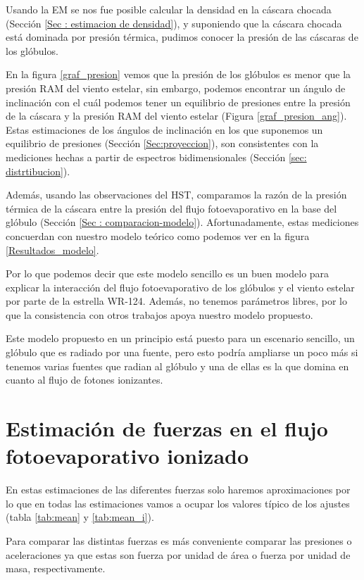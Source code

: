 \documentclass{book}
\begin{document}
Usando la EM se nos fue posible calcular la densidad en la cáscara chocada (Sección \ref{Sec : estimacion de densidad}), y suponiendo que la cáscara chocada está dominada por presión térmica, pudimos conocer la presión de las cáscaras de los glóbulos.

En la figura \ref{graf_presion} vemos que la presión de los glóbulos es menor que la presión RAM del viento estelar, sin embargo, podemos encontrar un ángulo de inclinación con el cuál podemos tener un equilibrio de presiones entre la presión de la cáscara y la presión RAM del viento estelar (Figura \ref{graf_presion_ang}). Estas estimaciones de los ángulos de inclinación en los que suponemos un equilibrio de presiones (Sección \ref{Sec:proyeccion}), son consistentes con la mediciones hechas a partir de espectros bidimensionales (Sección \ref{sec: distrtibucion}).

Además, usando las observaciones del HST, comparamos la razón de la presión térmica de la cáscara entre la presión del flujo fotoevaporativo en la base del glóbulo (Sección \ref{Sec : comparacion-modelo}). Afortunadamente, estas mediciones concuerdan con nuestro modelo teórico como podemos ver en la figura \ref{Resultados_modelo}.

Por lo que podemos decir que este modelo sencillo es un buen modelo para explicar la interacción del flujo fotoevaporativo de los glóbulos y el viento estelar por parte de la estrella WR-124. Además, no tenemos parámetros libres, por lo que la consistencia con otros trabajos apoya nuestro modelo propuesto.

Este modelo propuesto en un principio está puesto para un escenario sencillo, un glóbulo que es radiado por una fuente, pero esto podría ampliarse un poco más si tenemos varias fuentes que radian al glóbulo y una de ellas es la que domina en cuanto al flujo de fotones ionizantes. 

\appendix
\chapter{Estimación de fuerzas en el flujo fotoevaporativo ionizado} \label{App:fuerzas}

En estas estimaciones de las diferentes fuerzas solo haremos aproximaciones por lo que en todas las estimaciones vamos a ocupar los valores típico de los ajustes (tabla \ref{tab:mean} y \ref{tab:mean_i}).

Para comparar las distintas fuerzas es más conveniente comparar las presiones o aceleraciones ya que estas son fuerza por unidad de área o fuerza por unidad de masa, respectivamente. 
\end{document}
